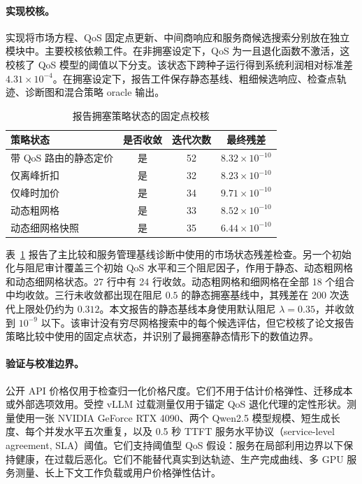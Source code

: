 \documentclass[UTF8,11pt,a4paper]{ctexart}
\begin{document}
\paragraph{实现校核。}

实现将市场方程、QoS 固定点更新、中间商响应和服务商候选搜索分别放在独立模块中。主要校核依赖工件。在非拥塞设定下，QoS 为一且退化函数不激活，这校核了 QoS 模型的阈值以下分支。该状态下跨种子运行得到系统利润相对标准差 $4.31\times10^{-4}$。在拥塞设定下，报告工件保存静态基线、粗细候选响应、检查点轨迹、诊断图和混合策略 oracle 输出。

\begin{table}[H]
\centering
\caption{报告拥塞策略状态的固定点校核}
\label{tab:fixed_point_verification}
\small
\begin{tabular}{lccc}
\toprule
策略状态 & 是否收敛 & 迭代次数 & 最终残差 \\
\midrule
带 QoS 路由的静态定价 & 是 & 52 & $8.32\times10^{-10}$ \\
仅离峰折扣 & 是 & 32 & $8.23\times10^{-10}$ \\
仅峰时加价 & 是 & 34 & $9.71\times10^{-10}$ \\
动态粗网格 & 是 & 33 & $8.52\times10^{-10}$ \\
动态细网格快照 & 是 & 35 & $6.44\times10^{-10}$ \\
\bottomrule
\end{tabular}
\end{table}

表~\ref{tab:fixed_point_verification} 报告了主比较和服务管理基线诊断中使用的市场状态残差检查。另一个初始化与阻尼审计覆盖三个初始 QoS 水平和三个阻尼因子，作用于静态、动态粗网格和动态细网格状态。27 行中有 24 行收敛。动态粗网格和细网格在全部 18 个组合中均收敛。三行未收敛都出现在阻尼 $0.5$ 的静态拥塞基线中，其残差在 200 次迭代上限处仍约为 $0.312$。本文报告的静态基线本身使用默认阻尼 $\lambda=0.35$，并收敛到 $10^{-9}$ 以下。该审计没有穷尽网格搜索中的每个候选评估，但它校核了论文报告策略比较中使用的固定点状态，并识别了最拥塞静态情形下的数值边界。

\paragraph{验证与校准边界。}

公开 API 价格仅用于检查归一化价格尺度。它们不用于估计价格弹性、迁移成本或外部选项效用。受控 vLLM 过载测量仅用于锚定 QoS 退化代理的定性形状。测量使用一张 NVIDIA GeForce RTX 4090、两个 Qwen2.5 模型规模、短生成长度、每个并发水平五次重复，以及 0.5 秒 TTFT 服务水平协议（service-level agreement, SLA）阈值。它们支持阈值型 QoS 假设：服务在局部利用边界以下保持健康，在过载后恶化。它们不能替代真实到达轨迹、生产完成曲线、多 GPU 服务测量、长上下文工作负载或用户价格弹性估计。
\end{document}
